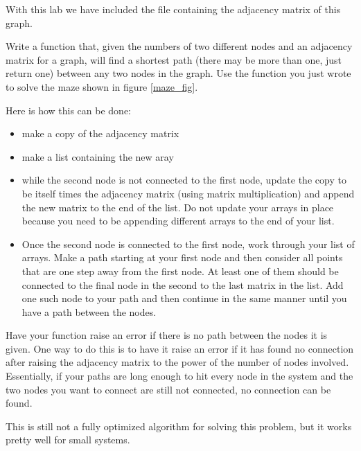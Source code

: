 With this lab we have included the file  containing the adjacency matrix of this graph.

\begin{problem} \label{maze_prob}
Write a function that, given the numbers of two different nodes and an adjacency matrix for a graph, will find a shortest path (there may be more than one, just return one) between any two nodes in the graph.
Use the function you just wrote to solve the maze shown in figure \ref{maze_fig}.

Here is how this can be done:
\begin{itemize}
\item make a copy of the adjacency matrix
\item make a list containing the new aray
\item while the second node is not connected to the first node, update the copy to be itself times the adjacency matrix (using matrix multiplication) and append the new matrix to the end of the list.
Do not update your arrays in place because you need to be appending different arrays to the end of your list.
\item Once the second node is connected to the first node, work through your list of arrays. 
Make a path starting at your first node and then consider all points that are one step away from the first node.
At least one of them should be connected to the final node in the second to the last matrix in the list.
Add one such node to your path and then continue in the same manner until you have a path between the nodes.
\end{itemize}

Have your function raise an error if there is no path between the nodes it is given.
One way to do this is to have it raise an error if it has found no connection after raising the adjacency matrix to the power of the number of nodes involved.
Essentially, if your paths are long enough to hit every node in the system and the two nodes you want to connect are still not connected, no connection can be found.

This is still not a fully optimized algorithm for solving this problem, but it works pretty well for small systems.
\end{problem}


